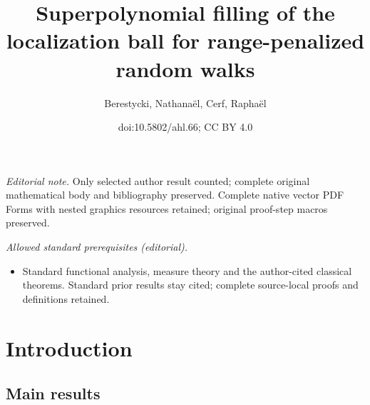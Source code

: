 \documentclass[10pt]{amsart}
\title{Superpolynomial filling of the localization ball for range-penalized random walks}
\author{Berestycki, Nathanaël, Cerf, Raphaël}
\date{doi:10.5802/ahl.66; CC BY 4.0}
\theoremstyle{definition}\newtheorem{defi}[theo]{Definition}\newtheorem{rema}[theo]{Remark}\newtheorem{exam}[theo]{Example}\newtheorem{exem}[theo]{Example}\newtheorem{nota}[theo]{Notation}
\begin{document}
\maketitle
\noindent\textit{Editorial note.} Only selected author result counted; complete original mathematical body and bibliography preserved. Complete native vector PDF Forms with nested graphics resources retained; original proof-step macros preserved.\par\medskip
\noindent\textit{Allowed standard prerequisites (editorial).}\begin{itemize}
\item Standard functional analysis, measure theory and the author-cited classical theorems. Standard prior results stay cited; complete source-local proofs and definitions retained.
\end{itemize}\medskip


\pagebreak
\tableofcontents
\pagebreak
\section{Introduction}

\subsection{Main results}
\end{document}

